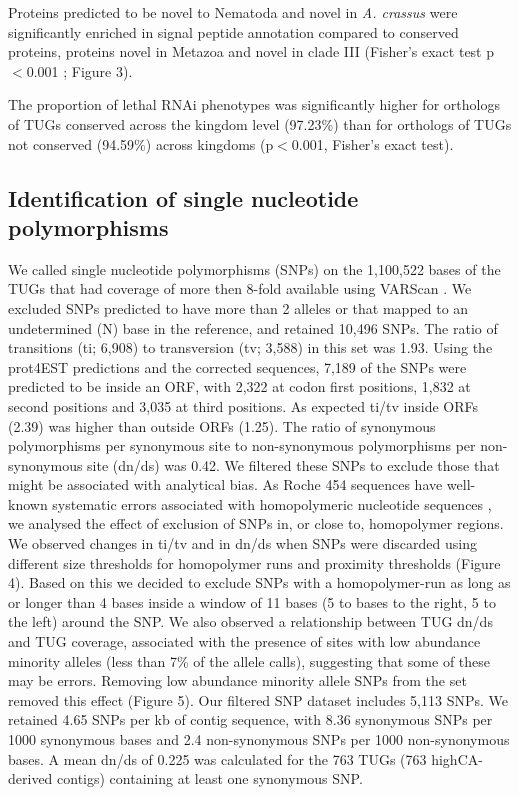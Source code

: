 \documentclass[10pt]{bmc_article}
\newenvironment{bmcformat}{\begin{raggedright}\baselineskip20pt\sloppy\setboolean{publ}{false}}{\end{raggedright}\baselineskip20pt\sloppy}
\begin{document}
\begin{bmcformat}
Proteins predicted to be novel to Nematoda and novel in
\textit{A. crassus} were significantly enriched in signal peptide
annotation compared to conserved proteins, proteins novel in Metazoa
and novel in clade III (Fisher's exact test p$<$0.001 ; Figure 3).

The proportion of lethal RNAi phenotypes was significantly higher for
orthologs of TUGs conserved across the kingdom level
(97.23\%) than for orthologs of
TUGs not conserved (94.59\%) across
kingdoms (p$<$0.001, Fisher's exact test).

\subsection*{Identification of single nucleotide polymorphisms}

We called single nucleotide polymorphisms (SNPs) on the
1,100,522 bases of the TUGs that had coverage of more
then 8-fold available using VARScan \cite{pmid19542151}. We excluded
SNPs predicted to have more than 2 alleles or that mapped to an
undetermined (N) base in the reference, and retained
10,496 SNPs. The ratio of transitions (ti;
6,908) to transversion (tv;
3,588) in this set was
1.93. Using the prot4EST
predictions and the corrected sequences, 7,189
of the SNPs were predicted to be inside an ORF, with
2,322 at codon first positions,
1,832 at second positions and
3,035 at third positions. As expected ti/tv
inside ORFs (2.39) was higher than outside ORFs
(1.25). The ratio of synonymous polymorphisms per
synonymous site to non-synonymous polymorphisms per non-synonymous
site (dn/ds) was 0.42. We filtered these SNPs to exclude
those that might be associated with analytical bias. As Roche 454
sequences have well-known systematic errors associated with
homopolymeric nucleotide sequences \cite{pmid21685085}, we analysed
the effect of exclusion of SNPs in, or close to, homopolymer
regions. We observed changes in ti/tv and in dn/ds when SNPs were
discarded using different size thresholds for homopolymer runs and
proximity thresholds (Figure 4). Based on this we decided to
exclude SNPs with a homopolymer-run as long as or longer than 4 bases
inside a window of 11 bases (5 to bases to the right, 5 to the left)
around the SNP. We also observed a relationship between TUG dn/ds and
TUG coverage, associated with the presence of sites with low abundance
minority alleles (less than 7\% of the allele calls), suggesting that
some of these may be errors. Removing low abundance minority allele
SNPs from the set removed this effect (Figure 5).  Our filtered SNP
dataset includes 5,113 SNPs. We retained
4.65 SNPs per kb of contig sequence, with
8.36 synonymous SNPs per 1000 synonymous bases and
2.4 non-synonymous SNPs per 1000 non-synonymous
bases. A mean dn/ds of 0.225 was
calculated for the 763 TUGs
(763 highCA-derived contigs)
containing at least one synonymous SNP.


\end{bmcformat}
\end{document}
